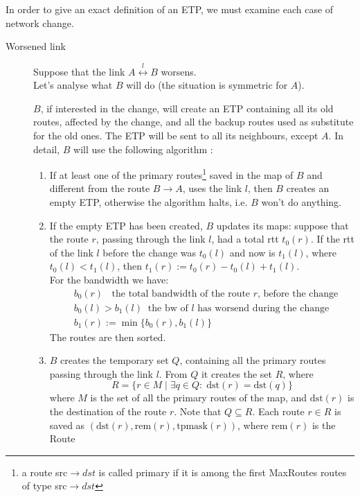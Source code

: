 \documentclass[a4paper]{article}
\newcommand{\T}[1]{\textrm{#1}}
\begin{document}
In order to give an exact definition of an ETP, we must examine each case of network change.
\begin{description}
	\item[Worsened link] Suppose that the link $A
		\stackrel{l}{\leftrightarrow} B$ worsens.\\
		Let's analyse what $B$ will do (the situation is symmetric for
		$A$).

		$B$, if interested in the change, will create an ETP
		containing all its old routes, affected by the change, and all
		the backup routes used as substitute for the old ones. The ETP
		will be sent to all its neighbours, except $A$. In detail,
		$B$ will use the following algorithm
		:
		\begin{enumerate}
		\item If at least one of the primary
		       routes\footnote{
				a route src$\rightarrow dst$ is called primary
				if it is among the first MaxRoutes routes of
				type src$\rightarrow dst$}
			saved in the map
			of $B$ and different from the route $B\rightarrow A$, uses the link $l$, then $B$ creates an
			empty ETP, otherwise the algorithm halts, i.e. $B$
			won't do anything.
		\item \label{upmap}
			If the empty ETP has been created, $B$ updates its maps:
			suppose that the route $r$, passing through the link
			$l$, had a total rtt $t_0(r)$. If the rtt of the link
			$l$ before the change was $t_0(l)$ and now is
			$t_1(l)$, where $t_0(l) < t_1(l)$, then
			$t_1(r):=t_0(r)-t_0(l)+t_1(l)$.\\
			For the bandwidth we have:
			\begin{align*}
				&b_0(r)\;\;\T{ the total bandwidth of the
				route $r$, before the change}\\
				&b_0(l) > b_1(l)\;\;\T{the bw of $l$ has
				worsend during the change}\\
				&b_1(r):=\min \{b_0(r), b_1(l)\}
			\end{align*}
			The routes are then sorted.
		\item \label{stepR} 
			$B$ creates the temporary set $Q$, 
			containing all the primary
			routes passing through the link $l$. From $Q$
			it creates the set $R$, where
			\[
			R=\{r\in M\;|\;\exists q\in Q:\;\T{dst}(r)=\T{dst}(q)\}
			\]
			where $M$ is the set of all the primary routes of the map, and 
			$\T{dst}(r)$ is the destination of the route $r$.
			Note that $Q\subseteq R$.
			Each
			route $r\in R$ is saved as $(\T{dst}(r), \T{rem}(r),
			\T{tpmask}(r))$, where $\T{rem}(r)$ is the Route

\end{enumerate}
\end{description}
\end{document}
